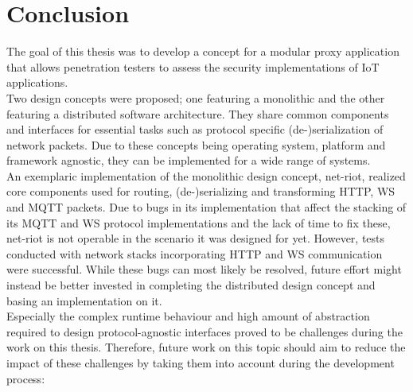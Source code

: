 \chapter{Conclusion}
\label{chap:conclusion}
The goal of this thesis was to develop a concept for a modular proxy application that allows penetration testers to assess the security implementations of \ac{IoT} applications.\\
Two design concepts were proposed; one featuring a monolithic and the other featuring a distributed software architecture. They share common components and interfaces for essential tasks such as protocol specific (de-)serialization of network packets. Due to these concepts being operating system, platform and framework agnostic, they can be implemented for a wide range of systems.\\
An exemplaric implementation of the monolithic design concept, net-riot, realized core components used for routing, (de-)serializing and transforming \ac{HTTP}, \ac{WS} and \ac{MQTT} packets. Due to bugs in its implementation that affect the stacking of its \ac{MQTT} and \ac{WS} protocol implementations and the lack of time to fix these, net-riot is not operable in the scenario it was designed for yet. However, tests conducted with network stacks incorporating \ac{HTTP} and \ac{WS} communication were successful. While these bugs can most likely be resolved, future effort might instead be better invested in completing the distributed design concept and basing an implementation on it.\\
Especially the complex runtime behaviour and high amount of abstraction required to design protocol-agnostic interfaces proved to be challenges during the work on this thesis. Therefore, future work on this topic should aim to reduce the impact of these challenges by taking them into account during the development process:
